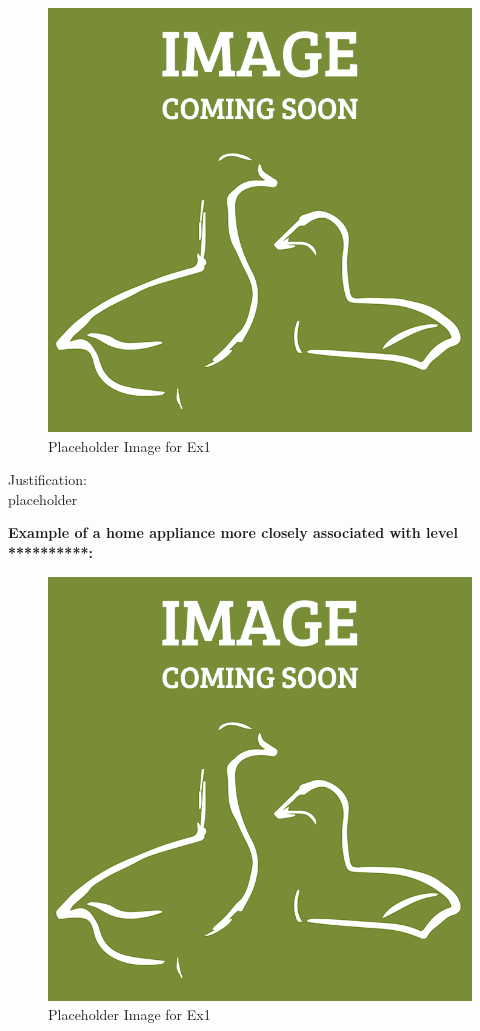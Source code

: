 \documentclass[a4paper,11pt,oneside]{scrreprt}
\begin{document}
\begin{figure}[H]
	\centering
	\includegraphics[clip, trim=0cm 0cm 0cm 0cm, scale=0.33]{./images/redesign.png}
	\caption{Placeholder Image for Ex1}
\end{figure}

\noindent Justification:\\
placeholder

\vspace{5mm}

\textbf{Example of a home appliance more closely associated with level **********:}

\begin{figure}[H]
	\centering
	\includegraphics[clip, trim=0cm 0cm 0cm 0cm, scale=0.33]{./images/redesign.png}
	\caption{Placeholder Image for Ex1}
\end{figure}
\end{document}
